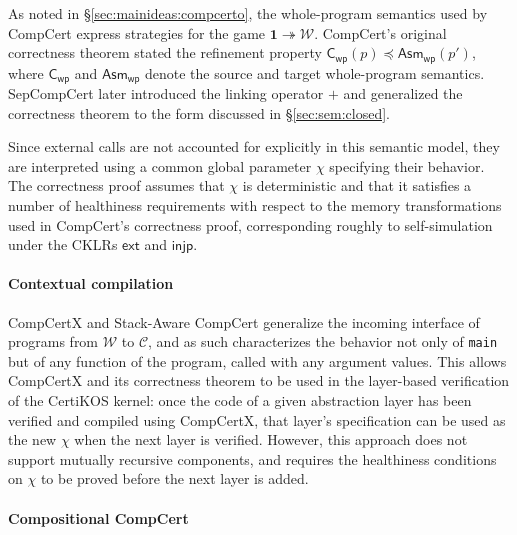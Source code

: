 \documentclass[sigplan,10pt,review]{acmart}
\newcommand{\kw}[1]{\ensuremath{ \mathsf{#1} }}
\newcommand{\refby}{\preceq}
\begin{document}
As noted in \S\ref{sec:mainideas:compcerto},
the whole-program semantics used by CompCert
express strategies for the game
$\mathbf{1} \twoheadrightarrow \mathcal{W}$.
CompCert's original correctness theorem
stated the refinement property
$\kw{C}_\kw{wp}(p) \refby \kw{Asm}_\kw{wp}(p')$,
where $\kw{C}_\kw{wp}$ and $\kw{Asm}_\kw{wp}$
denote the source and target whole-program semantics.
SepCompCert \cite{sepcompcert}
later introduced the linking operator $+$
and generalized the correctness theorem to
the form discussed in \S\ref{sec:sem:closed}.

Since external calls are not accounted for explicitly
in this semantic model,
they are interpreted %
using a common global parameter $\chi$
specifying their behavior.
The correctness proof assumes that $\chi$ is deterministic
and that it satisfies a number of healthiness requirements
with respect to the memory transformations
used in CompCert's correctness proof,
corresponding roughly to self-simulation
under the CKLRs $\kw{ext}$ and $\kw{injp}$.


\paragraph{Contextual compilation} %

CompCertX \cite{popl15} and
Stack-Aware CompCert \cite{stackaware}
generalize
the incoming interface of programs
from $\mathcal{W}$ to $\mathcal{C}$,
and as such characterizes the behavior
not only of \texttt{main}
but of any function of the program,
called with any argument values.
This allows CompCertX and its correctness theorem
to be used in the layer-based verification of
the CertiKOS kernel:
once the code of a given abstraction layer has been verified
and compiled using CompCertX,
that layer's specification can be used as the new $\chi$
when the next layer is verified.
However,
this approach does not support
mutually recursive components,
and requires the healthiness conditions on $\chi$
to be proved before the next layer is added.


\paragraph{Compositional CompCert} %
\end{document}
